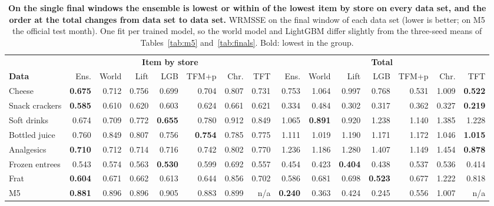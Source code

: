 \begin{table}[t]
\centering
\caption{\textbf{On the single final windows the ensemble is lowest or within  of the lowest item by
store on every data set, and the order at the total changes from data set to data set.} WRMSSE on the final
window of each data set (lower is better; on M5 the official test month). One fit per trained model, so the world
model and LightGBM differ slightly from the three-seed means of Tables~\ref{tab:m5} and~\ref{tab:finals}. Bold:
lowest in the group.}
\label{tab:finalsnew}
\footnotesize
\setlength{\tabcolsep}{3pt}
\begin{tabular}{l*{14}{r}}
\toprule
 & \multicolumn{7}{c}{\textbf{Item by store}} & \multicolumn{7}{c}{\textbf{Total}} \\
\cmidrule(lr){2-8}\cmidrule(lr){9-15}
\textbf{Data} & Ens. & World & Lift & LGB & TFM+p & Chr. & TFT & Ens. & World & Lift & LGB & TFM+p & Chr. & TFT \\
\midrule
Cheese & \textbf{0.675} & 0.712 & 0.756 & 0.699 & 0.704 & 0.807 & 0.731 & 0.753 & 1.064 & 0.997 & 0.768 & 0.531 & 1.009 & \textbf{0.522} \\
Snack crackers & \textbf{0.585} & 0.610 & 0.620 & 0.603 & 0.624 & 0.661 & 0.621 & 0.334 & 0.484 & 0.302 & 0.317 & 0.362 & 0.327 & \textbf{0.219} \\
Soft drinks & 0.674 & 0.709 & 0.772 & \textbf{0.655} & 0.780 & 0.912 & 0.849 & 1.065 & \textbf{0.891} & 0.920 & 1.238 & 1.140 & 1.385 & 1.228 \\
Bottled juice & 0.760 & 0.849 & 0.807 & 0.756 & \textbf{0.754} & 0.785 & 0.775 & 1.111 & 1.019 & 1.190 & 1.171 & 1.172 & 1.046 & \textbf{1.015} \\
Analgesics & \textbf{0.710} & 0.712 & 0.714 & 0.716 & 0.742 & 0.802 & 0.770 & 1.236 & 1.186 & 1.280 & 1.407 & 1.149 & 1.454 & \textbf{0.878} \\
Frozen entrees & 0.543 & 0.574 & 0.563 & \textbf{0.530} & 0.599 & 0.692 & 0.557 & 0.454 & 0.423 & \textbf{0.404} & 0.438 & 0.537 & 0.536 & 0.414 \\
Frat & \textbf{0.604} & 0.671 & 0.662 & 0.613 & 0.644 & 0.856 & 0.702 & 0.586 & 0.681 & 0.698 & \textbf{0.523} & 0.677 & 1.222 & 0.818 \\
M5 & \textbf{0.881} & 0.896 & 0.896 & 0.905 & 0.883 & 0.899 & n/a & \textbf{0.240} & 0.363 & 0.424 & 0.245 & 0.556 & 1.007 & n/a \\
\bottomrule
\end{tabular}
\end{table}
